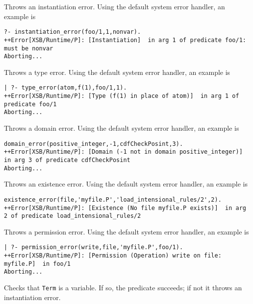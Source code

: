 \begin{description}
Throws an instantiation error.  Using the default system error
handler, an example is 
{\small 
\begin{verbatim}
?- instantiation_error(foo/1,1,nonvar).
++Error[XSB/Runtime/P]: [Instantiation]  in arg 1 of predicate foo/1: must be nonvar
Aborting...
\end{verbatim}
}

Throws a type error.  Using the default system error
handler, an example is 
{\small 
\begin{verbatim}
| ?- type_error(atom,f(1),foo/1,1).
++Error[XSB/Runtime/P]: [Type (f(1) in place of atom)]  in arg 1 of predicate foo/1
Aborting...
\end{verbatim}
}

Throws a domain error.  Using the default system error
handler, an example is 
{\small 
\begin{verbatim}
domain_error(positive_integer,-1,cdfCheckPosint,3).
++Error[XSB/Runtime/P]: [Domain (-1 not in domain positive_integer)]  in arg 3 of predicate cdfCheckPosint
Aborting...
\end{verbatim}
}

Throws an existence error.  Using the default system error
handler, an example is 
{\small 
\begin{verbatim}
existence_error(file,'myfile.P','load_intensional_rules/2',2).
++Error[XSB/Runtime/P]: [Existence (No file myfile.P exists)]  in arg 2 of predicate load_intensional_rules/2
\end{verbatim}
}

Throws a permission error.  Using the default system error
handler, an example is 
{\small 
\begin{verbatim}
| ?- permission_error(write,file,'myfile.P',foo/1).
++Error[XSB/Runtime/P]: [Permission (Operation) write on file: myfile.P]  in foo/1
Aborting...
\end{verbatim}
}


Checks that {\tt Term} is a variable.  If so, the predicate succeeds;
if not it throws an instantiation error.


\end{description}
